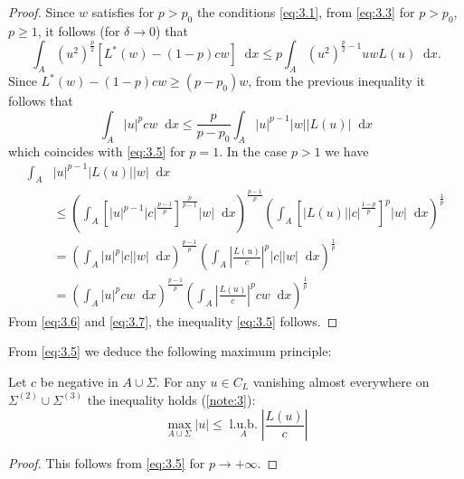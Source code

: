 \documentclass[a4paper,12pt,leqno]{article}
\numberwithin{equation}{section}
\newenvironment{thm}[1]
{\renewcommand\theinnerproblem{#1}\innerproblem}
{\endinnerproblem}
\newcommand{\dd}{\mathop{}\!\mathrm{d}}
\begin{document}
\begin{proof}
	Since $w$ satisfies for $p>p_{0}$ the conditions \eqref{eq:3.1}, from \eqref{eq:3.3} for $p>p_{0}$, $p \geq 1$, it follows (for $\delta \to 0$) that
	\begin{equation*}
		\int_{A}\left(u^{2}\right)^{\frac{p}{2}}\left[L^{*}(w)-(1-p) c w\right] \dd x \leq p \int_{A}\left(u^{2}\right)^{\frac{p}{2}-1} u w L(u) \dd x.
	\end{equation*}
	Since $L^{*}(w)-(1-p) c w \geq\left(p-p_{0}\right) w$, from the previous inequality it follows that
	\begin{equation}
		\label{eq:3.6}
		\int_{A}|u|^{p} c w \dd x \leq \frac{p}{p-p_{0}} \int_{A}|u|^{p-1}|w||L(u)| \dd x
	\end{equation}
	which coincides with \eqref{eq:3.5} for $p=1$. 
	In the case $p>1$ we have
	\begin{equation}
		\label{eq:3.7}
		\begin{split}
			\int_{A} & |u|^{p-1}|L(u)||w| \dd x \\
			& \leq \left(\int_{A}\left[|u|^{p-1}|c|^{\frac{p-1}{p}}\right]^{\frac{p}{p-1}}|w|\dd x\right)^{\frac{p-1}{p}}  \left(\int_{A}\left[|L(u)||c|^{\frac{1-p}{p}}\right]^{p}|w| \dd x\right)^{\frac{1}{p}} \\
			& = \left(\int_{A}|u|^{p}|c||w| \dd x\right)^{\frac{p-1}{p}}\left(\int_{A}\left|\frac{L(u)}{c}\right|^{p}|c||w| \dd x\right)^{\frac{1}{p}} \\
			& =\left(\int_{A}|u|^{p} c w \dd x\right)^{\frac{p-1}{p}}\left(\int_{A}\left|\frac{L(u)}{c}\right|^{p} c w \dd x\right)^{\frac{1}{p}}
		\end{split}
	\end{equation}
	From \eqref{eq:3.6} and \eqref{eq:3.7}, the inequality \eqref{eq:3.5} follows.
\end{proof}

From \eqref{eq:3.5} we deduce the following maximum principle:

\begin{thm}{V} \label{thm:V}
	Let $c$ be negative in $A \cup \Sigma$. 
	For any $u \in C_{L}$ vanishing almost everywhere on $\Sigma^{(2)} \cup \Sigma^{(3)}$ the inequality holds (\ref{note:3}):
	\begin{equation}
		\label{eq:3.8}
		\boxed{\max_{A\cup\Sigma} |u| \leq \underset{A}{\operatorname{l.u.b.}} \left|\frac{L(u)}{c}\right|}
	\end{equation}
\end{thm} 

\begin{proof}
	This follows from \eqref{eq:3.5} for $p \rightarrow+\infty$.
\end{proof}
\end{document}

